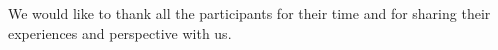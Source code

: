 \documentclass[manuscript,review,anonymous]{acmart}
\begin{document}
\ifx
\begin{acks}
We would like to thank all the participants for their time and for sharing their experiences and perspective with us.
\end{acks}
\fi



\appendix



\end{document}
